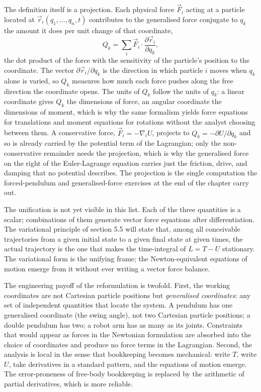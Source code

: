 The definition itself is a projection. Each physical force $\vec F_i$ acting
at a particle located at $\vec r_i(q_1,\ldots,q_n,t)$ contributes to the
generalised force conjugate to $q_k$ the amount it does per unit change of
that coordinate,
\[
Q_k = \sum_i \vec F_i\cdot\frac{\partial\vec r_i}{\partial q_k},
\]
the dot product of the force with the sensitivity of the particle's position
to the coordinate. The vector $\partial\vec r_i/\partial q_k$ is the direction
in which particle $i$ moves when $q_k$ alone is varied, so $Q_k$ measures how
much each force pushes along the free direction the coordinate opens. The units
of $Q_k$ follow the units of $q_k$: a linear coordinate gives $Q_k$ the
dimensions of force, an angular coordinate the dimensions of moment, which is
why the same formalism yields force equations for translations and moment
equations for rotations without the analyst choosing between them. A
conservative force, $\vec F_i = -\nabla_i U$, projects to $Q_k = -\partial U/
\partial q_k$ and so is already carried by the potential term of the
Lagrangian; only the non-conservative remainder needs the projection, which is
why the generalised force on the right of the Euler-Lagrange equation carries
just the friction, drive, and damping that no potential describes. The
projection is the single computation the forced-pendulum and generalised-force
exercises at the end of the chapter carry out.

The unification is not yet visible in this list. Each of the three
quantities is a scalar; combinations of them generate vector force
equations after differentiation. The variational principle of section
5.5 will state that, among all conceivable trajectories from a given
initial state to a given final state at given times, the actual
trajectory is the one that makes the time-integral of $L = T - U$
stationary. The variational form is the unifying frame; the
Newton-equivalent equations of motion emerge from it without ever
writing a vector force balance.

The engineering payoff of the reformulation is twofold. First, the
working coordinates are not Cartesian particle positions but
\emph{generalised coordinates}: any set of independent quantities
that locate the system. A pendulum has one generalised coordinate
(the swing angle), not two Cartesian particle positions; a double
pendulum has two; a robot arm has as many as its joints. Constraints
that would appear as forces in the Newtonian formulation are absorbed
into the choice of coordinates and produce no force terms in the
Lagrangian. Second, the analysis is local in the sense that bookkeeping
becomes mechanical: write $T$, write $U$, take derivatives in a
standard pattern, and the equations of motion emerge. The
error-proneness of free-body bookkeeping is replaced by the
arithmetic of partial derivatives, which is more reliable.


